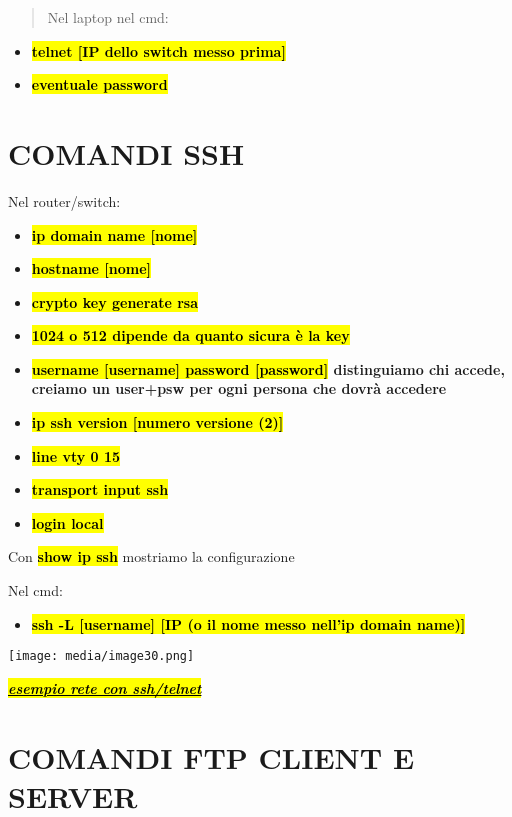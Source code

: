 \begin{quote}
Nel laptop nel cmd:
\end{quote}

\begin{itemize}
\item
  \textbf{\hl{telnet {[}IP dello switch messo prima{]}}}
\item
  \textbf{\hl{eventuale password}}
\end{itemize}

\section{COMANDI SSH}\label{comandi-ssh}

Nel router/switch:

\begin{itemize}
\item
  \textbf{\hl{ip domain name {[}nome{]}}}
\item
  \textbf{\hl{hostname {[}nome{]}}}
\item
  \textbf{\hl{crypto key generate rsa}}
\item
  \textbf{\hl{1024 o 512 dipende da quanto sicura è la key}}
\item
  \textbf{\hl{username {[}username{]} password {[}password{]}}
  distinguiamo chi accede, creiamo un user+psw per ogni persona che
  dovrà accedere}
\item
  \textbf{\hl{ip ssh version {[}numero versione (2){]}}}
\item
  \textbf{\hl{line vty 0 15}}
\item
  \textbf{\hl{transport input ssh}}
\item
  \textbf{\hl{login local}}
\end{itemize}

Con \textbf{\hl{show ip ssh}} mostriamo la configurazione

Nel cmd:

\begin{itemize}
\item
  \textbf{\hl{ssh -L {[}username{]} {[}IP (o il nome messo nell'ip
  domain name){]}}}
\end{itemize}

\texttt{[image: media/image30.png]}

\emph{\textbf{\hl{\ul{esempio rete con ssh/telnet}}}}

\section{COMANDI FTP CLIENT E SERVER}\label{comandi-ftp-client-e-server}

